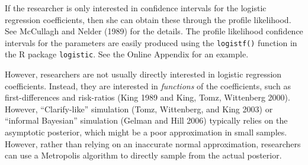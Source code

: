 \documentclass[12pt]{article}
\begin{document}
If the researcher is only interested in confidence intervals for the logistic regression coefficients, then she can obtain these through the profile likelihood. See McCullagh and Nelder (1989) for the details. The profile likelihood confidence intervals for the parameters are easily produced using the \texttt{logistf()} function in the R package \texttt{logistic}. See the Online Appendix for an example.

However, researchers are not usually directly interested in logistic regression coefficients. Instead, they are interested in \emph{functions} of the coefficients, such as first-differences and risk-ratios (King 1989 and King, Tomz, Wittenberg 2000). However, ``Clarify-like'' simulation (Tomz, Wittenberg, and King 2003) or ``informal Bayesian'' simulation (Gelman and Hill 2006) typically relies on the asymptotic posterior, which might be a poor approximation in small samples. However, rather than relying on an inaccurate normal approximation, researchers can use a Metropolis algorithm to directly sample from the actual posterior.
\end{document}

